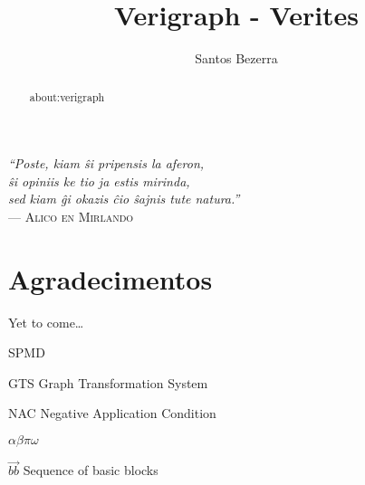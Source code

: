 \documentclass[ppgc,diss,english,openright]{iiufrgs}
\title{Verigraph - Verites}
\author{Santos Bezerra}{Jonas}
\begin{document}
  \maketitle
  \clearpage

  \clearpage
  \begin{flushright}
    \mbox{}\vfill
    {\sffamily\itshape
    ``Poste, kiam \^si pripensis la aferon,\\
    \^si opiniis ke tio ja estis mirinda,\\
    sed kiam \^gi okazis \^cio \^sajnis tute natura.''\\}
    --- \textsc{Alico en Mirlando}
  \end{flushright}

  \chapter*{Agradecimentos}
  Yet to come\ldots
  
  \begin{abstract}
    about:verigraph
  \end{abstract}

  \begin{listofabbrv}{SPMD}
          \item[GTS] Graph Transformation System
          \item[NAC] Negative Application Condition
  \end{listofabbrv}

  \begin{listofsymbols}{$\alpha\beta\pi\omega$}
         \item[$\vec{bb}$] Sequence of basic blocks
  \end{listofsymbols}

  \listoffigures
  \tableofcontents

  
  
  
  
  
  
  
  
  
\end{document}
